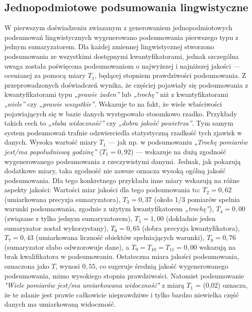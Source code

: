\documentclass{article}
\begin{document}
\subsection{Jednopodmiotowe podsumowania lingwistyczne}
W pierwszym doświadzeniu zwiazanym z generowaniem jednopodmiotowych podsumowań lingwistycznych wygenerowano podsumowania pierwszego typu z jednym sumaryzatorem. Dla każdej zmiennej lingwistycznej stworzono podsumowania ze wszystkimi dostępnymi kwantyfikatorami, jednak szczególna uwaga została poświęcona podsumowaniom o najwyższej i najniższej jakości — ocenianej za pomocą miary \( T_1 \), będącej stopniem prawdziwości podsumowania. Z przeprowadzonych doświadczeń wynika, że częściej pojawiały się podsumowania z kwantyfikatorami typu \textit{„prawie żaden”} lub \textit{„trochę”} niż z kwantyfikatorami \textit{„wiele”} czy \textit{„prawie wszystkie”}. Wskazuje to na fakt, że wiele właściwości pojawiających się w bazie danych występowało stosunkowo rzadko. Przykłady takich cech to \textit{„słaba widoczność”} czy \textit{„dobra jakość powietrza”}. Tym samym system podsumowań trafnie odzwierciedla statystyczną rzadkość tych zjawisk w danych.
Wysoka wartość miary \( T_1 \) — jak np. w podsumowaniu \textit{„Trochę pomiarów jest/ma popołudniową godzinę”} (\( T_1 = 0{,}92 \)) — wskazuje na dużą zgodność wygenerowanego podsumowania z rzeczywistymi danymi. Jednak, jak pokazują dodatkowe miary, taka zgodność nie zawsze oznacza wysoką ogólną jakość podsumowania. Dla tego konkretnego przykładu inne miary wskazują na różne aspekty jakości: Wartości miar jakości dla tego podsumowania to: \( T_2 = 0{,}62 \) (umiarkowana precyzja sumaryzatora), \( T_3 = 0{,}37 \) (około 1/3 pomiarów spełnia warunki podsumowania, zgodnie z użytym kwantyfikatorem \textit{„trochę”}), \( T_4 = 0{,}00 \) (związane z tylko jednym sumaryzatorem), \( T_5 = 1{,}00 \) (dokładnie jeden sumaryzator został wykorzystany), \( T_6 = 0{,}65 \) (dobra precyzja kwantyfikatora), \( T_7 = 0{,}43 \) (umiarkowana liczność obiektów spełniających warunki), \( T_8 = 0{,}76 \) (sumaryzator słabo odwzorowuje dane), a \( T_9 = T_{10} = T_{11} = 0{,}00 \) wskazują na brak kwalifikatora w podsumowaniu.
Ostateczna miara jakości podsumowania, oznaczona jako \( T \), wynosi \( 0{,}55 \), co sugeruje średnią jakość wygenerowanego podsumowania, mimo wysokiego stopnia prawdziwości.
Natomist podsumowanie \textit{"Wiele pomiarów jest/ma umiarkowana widoczność"} z miarą \(T_1\) = (0,02) oznacza, że te zdanie jest prawie całkowicie nieprawdziwe i tylko bardzo niewielka część danych ma umiarkowaną widoczność.
\end{document}
